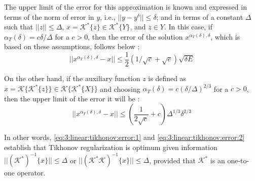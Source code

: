 			The upper limit of the error for this approximation is known and expressed in terms of the norm of error in $y$, i.e., $||y-y^\delta||\le\delta$; and in terms of a constant $\Delta$ such that $||z||\le\Delta$, $x=\mathcal{K}^*\{z\}\in\mathcal{K}^*\{Y\}$, and $z\in Y$. In this case, if $\alpha_T(\delta) = c\delta/\Delta$ for a $c>0$, then the error of the solution $x^{\alpha_T(\delta),\delta}$, which is based on these assumptions, follows below \citep{kirsch2011introduction}:
			\begin{equation}
				||x^{\alpha_T(\delta),\delta}-x|| \le \frac{1}{2}\left(1/\sqrt{c}+\sqrt{c}\right)\sqrt{\delta E} \label{eq:3:linear:tikhonov:error:1}
			\end{equation}
		
			On the other hand, if the auxiliary function $z$ is defined as$x=\mathcal{K}\{\mathcal{K}^*\{z\}\}\in\mathcal{K}\{\mathcal{K}^*\{X\}\}$ and choosing $\alpha_{T}(\delta) = c(\delta/\Delta)^{2/3}$ for a $c>0$, then the upper limit of the error it will be \citep{kirsch2011introduction}:
			\begin{equation}
				||x^{\alpha_T(\delta),\delta}-x|| \le \left(\frac{1}{2\sqrt{c}}+c\right)\Delta^{1/3}\delta^{2/3} \label{eq:3:linear:tikhonov:error:2}
			\end{equation}
		
			In other words, \eqref{eq:3:linear:tikhonov:error:1} and \eqref{eq:3:linear:tikhonov:error:2} establish that Tikhonov regularization is optimum given information $||\left(\mathcal{K}^*\right)^{-1}\{x\}||\le \Delta$  or $||\left(\mathcal{K}^*\mathcal{K}\right)^{-1}\{x\}||\le \Delta$, provided that $\mathcal{K}^*$ is an one-to-one operator.
			
